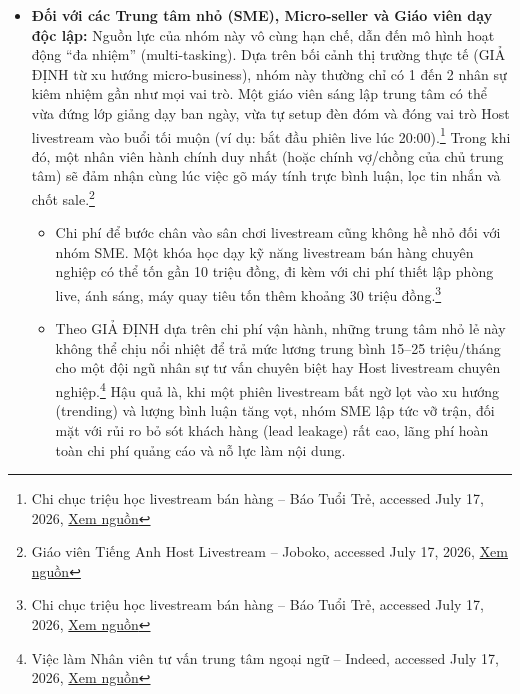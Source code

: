 \begin{itemize}
    \item \textbf{Đối với các Trung tâm nhỏ (SME), Micro-seller và Giáo viên dạy độc lập:} Nguồn lực của nhóm này vô cùng hạn chế, dẫn đến mô hình hoạt động ``đa nhiệm'' (multi-tasking). Dựa trên bối cảnh thị trường thực tế (GIẢ ĐỊNH từ xu hướng micro-business), nhóm này thường chỉ có 1 đến 2 nhân sự kiêm nhiệm gần như mọi vai trò. Một giáo viên sáng lập trung tâm có thể vừa đứng lớp giảng dạy ban ngày, vừa tự setup đèn đóm và đóng vai trò Host livestream vào buổi tối muộn (ví dụ: bắt đầu phiên live lúc 20:00).\footnote{Chi chục triệu học livestream bán hàng -- Báo Tuổi Trẻ, accessed July 17, 2026, \href{https://tuoitre.vn/nld/chi-chuc-trieu-hoc-livestream-ban-hang-196231203114313834.htm}{Xem nguồn}} Trong khi đó, một nhân viên hành chính duy nhất (hoặc chính vợ/chồng của chủ trung tâm) sẽ đảm nhận cùng lúc việc gõ máy tính trực bình luận, lọc tin nhắn và chốt sale.\footnote{Giáo viên Tiếng Anh Host Livestream -- Joboko, accessed July 17, 2026, \href{https://vn.joboko.com/viec-lam/giao-vien-tieng-anh-host-livestream-xvi6575019}{Xem nguồn}}

    \begin{itemize}
        \item Chi phí để bước chân vào sân chơi livestream cũng không hề nhỏ đối với nhóm SME. Một khóa học dạy kỹ năng livestream bán hàng chuyên nghiệp có thể tốn gần 10 triệu đồng, đi kèm với chi phí thiết lập phòng live, ánh sáng, máy quay tiêu tốn thêm khoảng 30 triệu đồng.\footnote{Chi chục triệu học livestream bán hàng -- Báo Tuổi Trẻ, accessed July 17, 2026, \href{https://tuoitre.vn/nld/chi-chuc-trieu-hoc-livestream-ban-hang-196231203114313834.htm}{Xem nguồn}}

        \item Theo GIẢ ĐỊNH dựa trên chi phí vận hành, những trung tâm nhỏ lẻ này không thể chịu nổi nhiệt để trả mức lương trung bình 15--25 triệu/tháng cho một đội ngũ nhân sự tư vấn chuyên biệt hay Host livestream chuyên nghiệp.\footnote{Việc làm Nhân viên tư vấn trung tâm ngoại ngữ -- Indeed, accessed July 17, 2026, \href{https://vn.indeed.com/q-nh\%C3\%A2n-vi\%C3\%AAn-t\%C6\%B0-v\%E1\%BA\%A5n-trung-t\%C3\%A2m-ngo\%E1\%BA\%A1i-ng\%E1\%BB\%AF-vi\%E1\%BB\%87c-l\%C3\%A0m.html}{Xem nguồn}} Hậu quả là, khi một phiên livestream bất ngờ lọt vào xu hướng (trending) và lượng bình luận tăng vọt, nhóm SME lập tức vỡ trận, đối mặt với rủi ro bỏ sót khách hàng (lead leakage) rất cao, lãng phí hoàn toàn chi phí quảng cáo và nỗ lực làm nội dung.
    \end{itemize}
\end{itemize}

